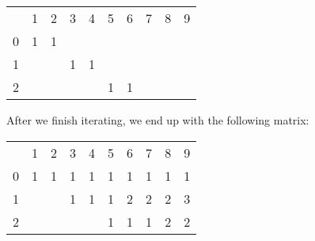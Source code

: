 \documentclass{article}
\begin{document}
\begin{table}[h]
\begin{tabular}{llllllllll}
                       & 1                      & 2                      & 3                      & 4                      & 5                      & 6                      & 7                     & 8                     & 9                     \\ \cline{2-10} 
\multicolumn{1}{l|}{0} & \multicolumn{1}{l|}{1} & \multicolumn{1}{l|}{1} & \multicolumn{1}{l|}{}  & \multicolumn{1}{l|}{}  & \multicolumn{1}{l|}{}  & \multicolumn{1}{l|}{}  & \multicolumn{1}{l|}{} & \multicolumn{1}{l|}{} & \multicolumn{1}{l|}{} \\ \cline{2-10} 
\multicolumn{1}{l|}{1} & \multicolumn{1}{l|}{}  & \multicolumn{1}{l|}{}  & \multicolumn{1}{l|}{1} & \multicolumn{1}{l|}{1} & \multicolumn{1}{l|}{}  & \multicolumn{1}{l|}{}  & \multicolumn{1}{l|}{} & \multicolumn{1}{l|}{} & \multicolumn{1}{l|}{} \\ \cline{2-10} 
\multicolumn{1}{l|}{2} & \multicolumn{1}{l|}{}  & \multicolumn{1}{l|}{}  & \multicolumn{1}{l|}{}  & \multicolumn{1}{l|}{}  & \multicolumn{1}{l|}{1} & \multicolumn{1}{l|}{1} & \multicolumn{1}{l|}{} & \multicolumn{1}{l|}{} & \multicolumn{1}{l|}{} \\ \cline{2-10} 
\end{tabular}
\end{table}

After we finish iterating, we end up with the following matrix:

\begin{table}[h]
\begin{tabular}{llllllllll}
                       & 1                      & 2                      & 3                      & 4                      & 5                      & 6                      & 7                      & 8                      & 9                      \\ \cline{2-10} 
\multicolumn{1}{l|}{0} & \multicolumn{1}{l|}{1} & \multicolumn{1}{l|}{1} & \multicolumn{1}{l|}{1} & \multicolumn{1}{l|}{1} & \multicolumn{1}{l|}{1} & \multicolumn{1}{l|}{1} & \multicolumn{1}{l|}{1} & \multicolumn{1}{l|}{1} & \multicolumn{1}{l|}{1} \\ \cline{2-10} 
\multicolumn{1}{l|}{1} & \multicolumn{1}{l|}{}  & \multicolumn{1}{l|}{}  & \multicolumn{1}{l|}{1} & \multicolumn{1}{l|}{1} & \multicolumn{1}{l|}{1} & \multicolumn{1}{l|}{2} & \multicolumn{1}{l|}{2} & \multicolumn{1}{l|}{2} & \multicolumn{1}{l|}{3} \\ \cline{2-10} 
\multicolumn{1}{l|}{2} & \multicolumn{1}{l|}{}  & \multicolumn{1}{l|}{}  & \multicolumn{1}{l|}{}  & \multicolumn{1}{l|}{}  & \multicolumn{1}{l|}{1} & \multicolumn{1}{l|}{1} & \multicolumn{1}{l|}{1} & \multicolumn{1}{l|}{2} & \multicolumn{1}{l|}{2} \\ \cline{2-10} 
\end{tabular}
\end{table}
\end{document}
